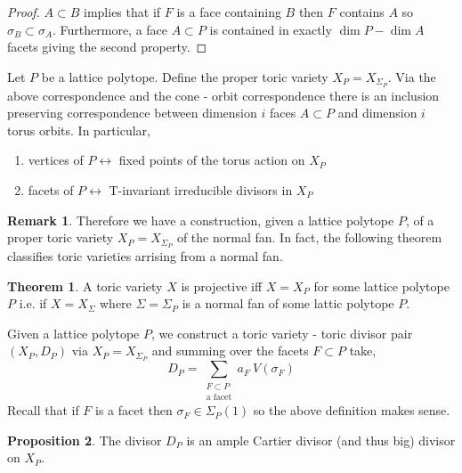 \documentclass[12pt]{extarticle}
\theoremstyle{definition}
\newtheorem{theorem}{Theorem}[section]
\newtheorem{proposition}[theorem]{Proposition}
\newtheorem{remark}{Remark}
\newenvironment{definition}[1][Definition:]{\begin{trivlist}
\item[\hskip \labelsep {\bfseries #1}]}{\end{trivlist}}
\begin{document}
\begin{proof}
$A \subset B$ implies that if $F$ is a face containing $B$ then $F$ contains $A$ so $\sigma_B \subset \sigma_A$. Furthermore, a face $A \subset P$ is contained in exactly $\dim{P} - \dim{A}$ facets giving the second property. 
\end{proof}

\begin{definition}
Let $P$ be a lattice polytope. Define the proper toric variety $X_P = X_{\Sigma_P}$. Via the above correspondence and the cone - orbit correspondence there is an inclusion preserving correspondence between dimension $i$ faces $A \subset P$ and dimension $i$ torus orbits. In particular,
\begin{enumerate}
\item vertices of $P \leftrightarrow$ fixed points of the torus action on $X_P$
\item facets of $P \leftrightarrow$ T-invariant irreducible divisors in $X_P$
\end{enumerate}
\end{definition}

\begin{remark}
Therefore we have a construction, given a lattice polytope $P$, of a proper toric variety $X_P = X_{\Sigma_P}$ of the normal fan. In fact, the following theorem classifies toric varieties arrising from a normal fan.
\end{remark}

\begin{theorem}
A toric variety $X$ is projective iff $X = X_P$ for some lattice polytope $P$ i.e. if $X = X_\Sigma$ where $\Sigma = \Sigma_P$ is a normal fan of some lattic polytope $P$.
\end{theorem}

\begin{definition}
Given a lattice polytope $P$, we construct a toric variety - toric divisor pair $(X_P, D_P)$ via $X_P = X_{\Sigma_P}$ and summing over the facets $F \subset P$ take,
\[ D_P = \sum_{\substack{F \subset P \\ \text{a facet}}} a_F \: V(\sigma_F) \]
Recall that if $F$ is a facet then $\sigma_F \in \Sigma_P(1)$ so the above definition makes sense. 
\end{definition}

\begin{proposition}
The divisor $D_P$ is an ample Cartier divisor (and thus big) divisor on $X_P$.
\end{proposition}
\end{document}
